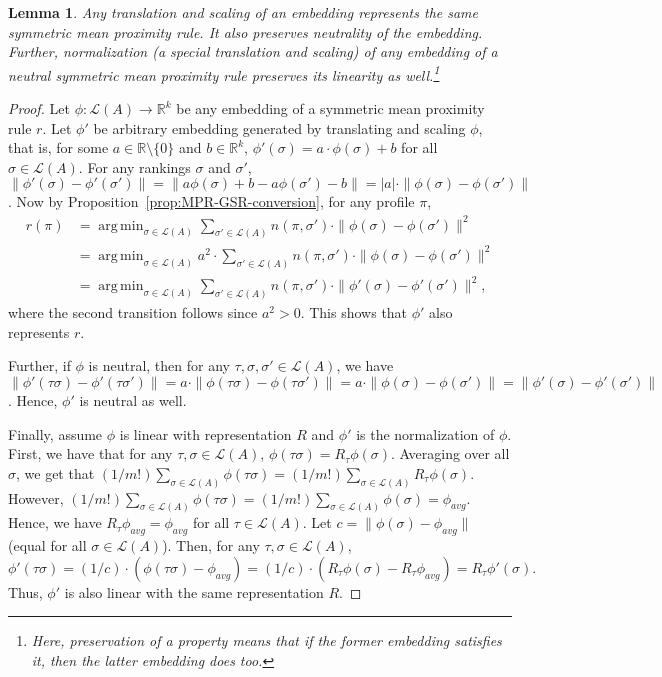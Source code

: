 \documentclass[10pt,letterpaper]{article}
\newcommand{\calL}{{\mathcal{L}}}
\newcommand{\rank}{{\calL(A)}}
\DeclareMathOperator*{\argmin}{arg\,min}
\newtheorem{lemma}{Lemma}
\begin{document}
\begin{lemma}
Any translation and scaling of an embedding represents the same symmetric mean proximity rule. It also preserves neutrality of the embedding. Further, normalization (a special translation and scaling) of any embedding of a neutral symmetric mean proximity rule preserves its linearity as well.\footnote{Here, preservation of a property means that if the former embedding satisfies it, then the latter embedding does too.}
\label{lem:preservation}
\end{lemma}
\begin{proof}
Let $\phi : \rank \rightarrow \mathbb{R}^k$ be any embedding of a symmetric mean proximity rule $r$. Let $\phi'$ be arbitrary embedding generated by translating and scaling $\phi$, that is, for some $a \in \mathbb{R}\setminus\{0\}$ and $b \in \mathbb{R}^k$, $\phi'(\sigma) = a \cdot \phi(\sigma) + b$ for all $\sigma \in \rank$. For any rankings $\sigma$ and $\sigma'$, $\|\phi'(\sigma)-\phi'(\sigma')\| = \|a\phi(\sigma)+b-a\phi(\sigma')-b\| = |a| \cdot \|\phi(\sigma)-\phi(\sigma')\|$. Now by Proposition~\ref{prop:MPR-GSR-conversion}, for any profile $\pi$,
\begin{align*}
r(\pi) &= \argmin_{\sigma \in \rank} \sum_{\sigma' \in \rank} n(\pi,\sigma') \cdot \|\phi(\sigma)-\phi(\sigma')\|^2 \\
&= \argmin_{\sigma \in \rank} a^2 \cdot \sum_{\sigma' \in \rank} n(\pi,\sigma') \cdot \|\phi(\sigma)-\phi(\sigma')\|^2 \\
&= \argmin_{\sigma \in \rank} \sum_{\sigma' \in \rank} n(\pi,\sigma') \cdot \|\phi'(\sigma)-\phi'(\sigma')\|^2,
\end{align*}
where the second transition follows since $a^2 > 0$. This shows that $\phi'$ also represents $r$. 

Further, if $\phi$ is neutral, then for any $\tau,\sigma,\sigma' \in \rank$, we have $\|\phi'(\tau \sigma)-\phi'(\tau \sigma')\| = a \cdot \|\phi(\tau \sigma)-\phi(\tau \sigma')\| = a \cdot \|\phi(\sigma)-\phi(\sigma')\| = \|\phi'(\sigma)-\phi'(\sigma')\|$. Hence, $\phi'$ is neutral as well. 

Finally, assume $\phi$ is linear with representation $R$ and $\phi'$ is the normalization of $\phi$. First, we have that for any $\tau,\sigma \in \rank$, $\phi(\tau \sigma) = R_{\tau}\phi(\sigma)$. Averaging over all $\sigma$, we get that $(1/{m!}) \sum_{\sigma \in \rank} \phi(\tau \sigma) = (1/{m!}) \sum_{\sigma \in \rank} R_{\tau} \phi(\sigma)$. However, $(1/{m!}) \sum_{\sigma \in \rank} \phi(\tau \sigma) = (1/{m!}) \sum_{\sigma \in \rank} \phi(\sigma) = \phi_{avg}$. Hence, we have $R_{\tau}\phi_{avg} = \phi_{avg}$ for all $\tau \in \rank$. Let $c = \|\phi(\sigma)-\phi_{avg}\|$ (equal for all $\sigma \in \rank$). Then, for any $\tau,\sigma \in \rank$, 
$$
\phi'(\tau \sigma) = (1/c) \cdot (\phi(\tau \sigma) - \phi_{avg}) = (1/c) \cdot (R_{\tau}\phi(\sigma) - R_{\tau}\phi_{avg}) = R_{\tau}\phi'(\sigma).
$$
Thus, $\phi'$ is also linear with the same representation $R$.
\end{proof}
\end{document}
